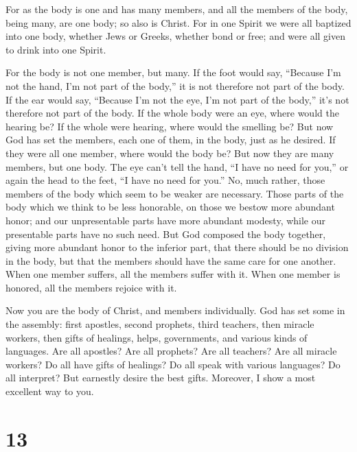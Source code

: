  For as the body is one and has many members, and all the
members of the body, being many, are one body; so also is Christ.
 For in one Spirit we were all baptized into one body,
whether Jews or Greeks, whether bond or free; and were all given to
drink into one Spirit.

 For the body is not one member, but many.  If
the foot would say, ``Because I'm not the hand, I'm not part of the
body,'' it is not therefore not part of the body.  If the
ear would say, ``Because I'm not the eye, I'm not part of the body,''
it's not therefore not part of the body.  If the whole body
were an eye, where would the hearing be? If the whole were hearing,
where would the smelling be?  But now God has set the
members, each one of them, in the body, just as he desired.
 If they were all one member, where would the body be?
 But now they are many members, but one body. 
The eye can't tell the hand, ``I have no need for you,'' or again the
head to the feet, ``I have no need for you.''  No, much
rather, those members of the body which seem to be weaker are necessary.
 Those parts of the body which we think to be less
honorable, on those we bestow more abundant honor; and our unpresentable
parts have more abundant modesty,  while our presentable
parts have no such need. But God composed the body together, giving more
abundant honor to the inferior part,  that there should be
no division in the body, but that the members should have the same care
for one another.  When one member suffers, all the members
suffer with it. When one member is honored, all the members rejoice with
it.

 Now you are the body of Christ, and members individually.
 God has set some in the assembly: first apostles, second
prophets, third teachers, then miracle workers, then gifts of healings,
helps, governments, and various kinds of languages.  Are
all apostles? Are all prophets? Are all teachers? Are all miracle
workers?  Do all have gifts of healings? Do all speak with
various languages? Do all interpret?  But earnestly desire
the best gifts. Moreover, I show a most excellent way to you.

\hypertarget{section-12}{%
\section{13}\label{section-12}}

